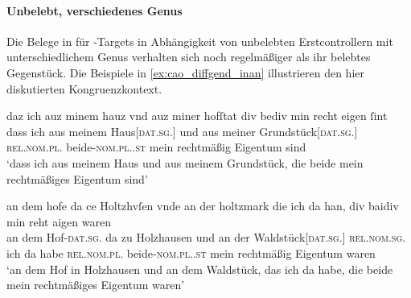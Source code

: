 %

\paragraph{Unbelebt, verschiedenes Genus}

Die Belege in  für -Targets in
Abhängigkeit von unbelebten Erstcontrollern mit unterschiedlichem Genus
verhalten sich noch regelmäßiger als ihr belebtes Gegenstück. Die Beispiele in
\cref{ex:cao_diffgend_inan} illustrieren den hier diskutierten
Kongruenzkontext.

\begin{exe}
\ex \label{ex:cao_diffgend_inan}
	\begin{xlist}
	\ex \label{ex:cao_diffgend_inan_1}
		\gll daz ich auz minem hauz vnd auz miner hofſtat
			div bediv min recht eigen ſint \\
			dass ich aus meinem Haus[\textsc{dat.sg.\NeutI}] und aus meiner
			Grundstück[\textsc{dat.sg.\FemI}] \textsc{rel.nom.pl.\NeutI}
			beide-\textsc{nom.pl.\NeutI.st} mein rechtmäßig Eigentum sind \\
		\trans `dass ich aus meinem Haus und aus meinem Grundstück, die 
			beide mein rechtmäßiges Eigentum sind'
			\parencites(Nr.~1282, Regensburg, 1290)[526,37--38]{cao2}

	\ex \label{ex:cao_diffgend_inan_2}
		\gll an dem hofe da ce Holtzhvſen \textelp{} vnde an der
			holtzmark die ich da han, div baidiv min
			reht aigen waren \\
			an dem Hof-\textsc{dat.sg.\MascI} da zu Holzhausen {} und an der
			Waldstück[\textsc{dat.sg.\FemI}] \textsc{rel.nom.sg.\FemI} ich da habe
			\textsc{rel.nom.pl.\NeutI} beide-\textsc{nom.pl.\NeutI.st} mein
			rechtmäßig Eigentum waren \\
		\trans `an dem Hof in Holzhausen \textelp{} und an dem Waldstück,
			das ich da habe, die beide mein rechtmäßiges Eigentum waren'
			\parencites(Nr.~N~272, Augsburg, 1285)[215,30--31]{cao5}
	\end{xlist}
\end{exe}

